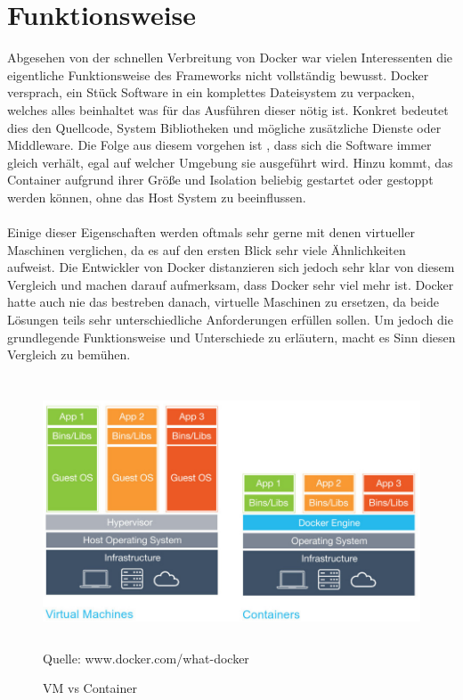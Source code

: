 \documentclass[12pt,toc=bib,toc=listof]{scrreprt}
\begin{document}
\section{Funktionsweise}

Abgesehen von der schnellen Verbreitung von Docker war vielen Interessenten die eigentliche Funktionsweise des Frameworks nicht vollständig bewusst.
Docker versprach, ein Stück Software in ein komplettes Dateisystem zu verpacken, welches alles beinhaltet was für das Ausführen dieser  nötig ist. 
Konkret bedeutet dies den Quellcode, System Bibliotheken und mögliche zusätzliche Dienste oder Middleware. 
Die Folge aus diesem vorgehen ist , dass sich die Software immer gleich verhält, egal auf welcher Umgebung sie ausgeführt wird. 
Hinzu kommt, das Container aufgrund ihrer Größe und Isolation  beliebig gestartet oder gestoppt werden können, ohne das Host System zu beeinflussen.\\
\\
Einige dieser Eigenschaften werden oftmals sehr gerne mit denen virtueller Maschinen verglichen, da es auf den ersten Blick sehr viele Ähnlichkeiten aufweist.
Die Entwickler von Docker distanzieren sich jedoch sehr klar von diesem Vergleich und machen darauf aufmerksam, dass Docker sehr viel mehr ist.
Docker hatte auch nie das bestreben danach, virtuelle Maschinen zu ersetzen, da beide Lösungen teils sehr unterschiedliche Anforderungen erfüllen sollen. 
Um jedoch die grundlegende Funktionsweise und Unterschiede zu erläutern, macht es Sinn diesen Vergleich zu bemühen.\\
\begin{figure}
	\centering
	\caption{VM vs Container}
	\includegraphics[width=15cm, height=8cm, scale=0.3]{dockerVM.jpg}
	Quelle: www.docker.com/what-docker
\end{figure}
\end{document}
